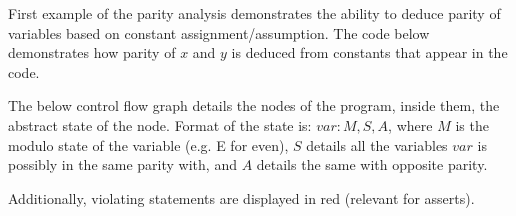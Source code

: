 First example of the parity analysis demonstrates the ability to deduce
parity of variables based on constant assignment/assumption.  The code
below demonstrates how parity of $x$ and $y$ is deduced from constants
that appear in the code.

The below control flow graph details the nodes of the program, inside
them, the abstract state of the node. Format of the state is: 
$var: M, S, A$, where $M$ is the modulo state of the variable
(e.g. E for even), $S$ details all the variables $var$ is possibly in
the same parity with, and $A$ details the same with opposite parity.

Additionally, violating statements are displayed in red (relevant for
asserts).
